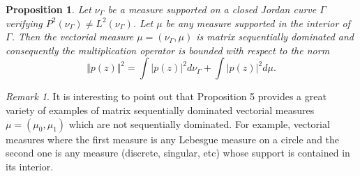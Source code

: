 \documentclass[12pt]{amsart}
\theoremstyle{definition}
\theoremstyle{plain}
\newtheorem{corollary}{Corollary}
\newtheorem{prop}{Proposition}
\theoremstyle{remark}
\newtheorem{remark}{Remark}
\DeclareMathOperator{\CC}{\mathbb C}
\begin{document}
\begin{prop} Let $\nu_{\Gamma}$ be a measure supported on a closed Jordan curve $\Gamma$ verifying $P^{2}(\nu_{\Gamma}) \neq L^{2}(\nu_{\Gamma})$. Let $\mu$ be any measure supported in the interior of $\Gamma$. Then the vectorial measure  $\mu=(\nu_{\Gamma},\mu)$  is matrix sequentially dominated and consequently the multiplication operator is bounded with respect to the norm 
$$
\Vert p(z) \Vert^{2} = \int \vert p(z) \vert^{2} d\nu_{\Gamma} + \int \vert p(z) \vert^{2} d\mu .
$$
\end{prop} 










\noindent \begin{remark} It is interesting to point out  that  Proposition 5  provides a great variety  of examples of matrix sequentially dominated vectorial measures $\mu=(\mu_0,\mu_1)$ which are not sequentially dominated. For example, vectorial measures where  the first measure is any Lebesgue measure on a circle and the second one is any measure (discrete, singular, etc) whose  support is contained in its interior. 
\end{remark}
\end{document}
